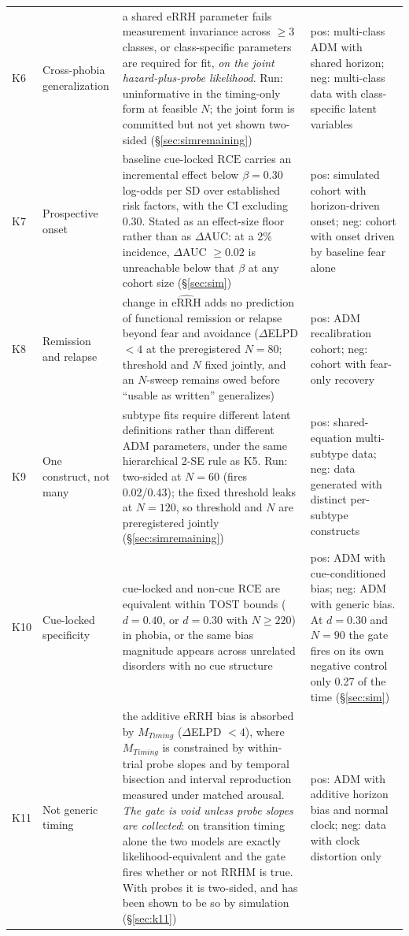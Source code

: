 \documentclass[9pt,twocolumn]{article}
\newcommand{\eRRHhat}{\widehat{\mathrm{eRRH}}}
\newcommand{\RCE}{\mathrm{RCE}}
\begin{document}
\begin{table}[!t]
\begin{tabularx}{\textwidth}{p{}p{}X p{}}
K6 & Cross-phobia generalization & a shared eRRH parameter fails measurement invariance across $\ge3$ classes, or class-specific parameters are required for fit, \emph{on the joint hazard-plus-probe likelihood}. Run: uninformative in the timing-only form at feasible $N$; the joint form is committed but not yet shown two-sided (\S\ref{sec:simremaining}) & pos: multi-class ADM with shared horizon; neg: multi-class data with class-specific latent variables \\
K7 & Prospective onset & baseline cue-locked $\RCE$ carries an incremental effect below $\beta=0.30$ log-odds per SD over established risk factors, with the CI excluding $0.30$. Stated as an effect-size floor rather than as $\Delta$AUC: at a 2\% incidence, $\Delta$AUC $\ge0.02$ is unreachable below that $\beta$ at any cohort size (\S\ref{sec:sim}) & pos: simulated cohort with horizon-driven onset; neg: cohort with onset driven by baseline fear alone \\
K8 & Remission and relapse & change in $\eRRHhat$ adds no prediction of functional remission or relapse beyond fear and avoidance ($\Delta$ELPD $<4$ at the preregistered $N{=}80$; threshold and $N$ fixed jointly, and an $N$-sweep remains owed before ``usable as written'' generalizes) & pos: ADM recalibration cohort; neg: cohort with fear-only recovery \\
K9 & One construct, not many & subtype fits require different latent definitions rather than different ADM parameters, under the same hierarchical 2-SE rule as K5. Run: two-sided at $N=60$ (fires 0.02/0.43); the fixed threshold leaks at $N=120$, so threshold and $N$ are preregistered jointly (\S\ref{sec:simremaining}) & pos: shared-equation multi-subtype data; neg: data generated with distinct per-subtype constructs \\
K10 & Cue-locked specificity & cue-locked and non-cue $\RCE$ are equivalent within TOST bounds ($d=0.40$, or $d=0.30$ with $N\ge220$) in phobia, or the same bias magnitude appears across unrelated disorders with no cue structure & pos: ADM with cue-conditioned bias; neg: ADM with generic bias. At $d=0.30$ and $N=90$ the gate fires on its own negative control only 0.27 of the time (\S\ref{sec:sim}) \\
K11 & Not generic timing & the additive eRRH bias is absorbed by $M_{Timing}$ ($\Delta$ELPD $<4$), where $M_{Timing}$ is constrained by within-trial probe slopes and by temporal bisection and interval reproduction measured under matched arousal. \emph{The gate is void unless probe slopes are collected}: on transition timing alone the two models are exactly likelihood-equivalent and the gate fires whether or not RRHM is true. With probes it is two-sided, and has been shown to be so by simulation (\S\ref{sec:k11}) & pos: ADM with additive horizon bias and normal clock; neg: data with clock distortion only \\
\bottomrule
\end{tabularx}
\end{table}
\end{document}
